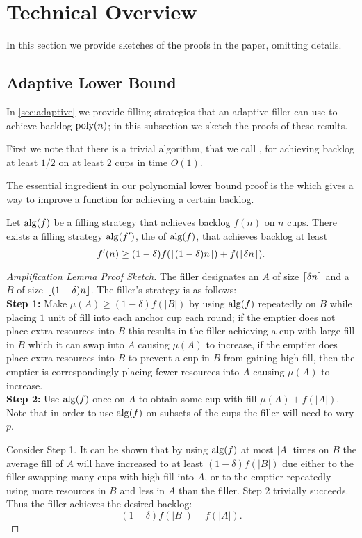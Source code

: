 \section{Technical Overview}
\label{sec:technical_overview}

In this section we provide sketches of the proofs in the paper,
omitting details.

\subsection{Adaptive Lower Bound}
In \cref{sec:adaptive} we provide filling strategies that an
adaptive filler can use to achieve backlog $\operatorname{\text{poly}}(n)$; in this
subsection we sketch the proofs of these results.

First we note that there is a trivial algorithm, that we call
, for achieving backlog at least $1/2$ on at
least $2$ cups in time $O(1)$.

The essential ingredient in our polynomial lower bound proof is
the  which gives a way to improve a
function for achieving a certain backlog.
\begin{lemma}
  Let $\operatorname{\text{\textup{alg}}}(f)$ be a filling strategy that achieves backlog
  $f(n)$ on $n$ cups. There exists a filling strategy $\operatorname{\text{\textup{alg}}}(f')$,
  the  of $\operatorname{\text{\textup{alg}}}(f)$, that achieves backlog at
  least $$f'(n) \ge (1-\delta) f(\left\lfloor (1-\delta)n \right\rfloor) +
  f(\left\lceil \delta n \right\rceil).$$
\end{lemma}
\begin{proof}[Amplification Lemma Proof Sketch]
The filler designates an  $A$ of size
$\left\lceil \delta n \right\rceil$ and a  $B$ of size
$\left\lfloor (1-\delta)n \right\rfloor$. The filler's strategy is as follows:\\
\textbf{Step 1:} 
Make $\mu(A) \ge (1-\delta) f(|B|)$ by using $\operatorname{\text{\textup{alg}}}(f)$ repeatedly
on $B$ while placing $1$ unit of fill into each anchor cup each
round; if the emptier does not place extra resources into $B$
this results in the filler achieving a cup with large fill in $B$
which it can swap into $A$ causing $\mu(A)$ to increase, if the
emptier does place extra resources into $B$ to prevent a cup in
$B$ from gaining high fill, then the emptier is correspondingly
placing fewer resources into $A$ causing $\mu(A)$ to increase.\\
\textbf{Step 2:} Use $\operatorname{\text{\textup{alg}}}(f)$ once on $A$ to obtain some cup
with fill $\mu(A)+f(|A|)$.\\
Note that in order to use $\operatorname{\text{\textup{alg}}}(f)$ on subsets of the cups the
filler will need to vary $p$.

Consider Step 1. It can be shown that by using $\operatorname{\text{\textup{alg}}}(f)$ at most
$|A|$ times on $B$ the average fill of $A$ will have increased to
at least $(1-\delta)f(|B|)$ due either to the filler swapping
many cups with high fill into $A$, or to the emptier repeatedly
using more resources in $B$ and less in $A$ than the filler.
Step 2 trivially succeeds. Thus the filler achieves the desired
backlog:
$$(1-\delta) f(|B|) + f(|A|).$$
  
\end{proof}

